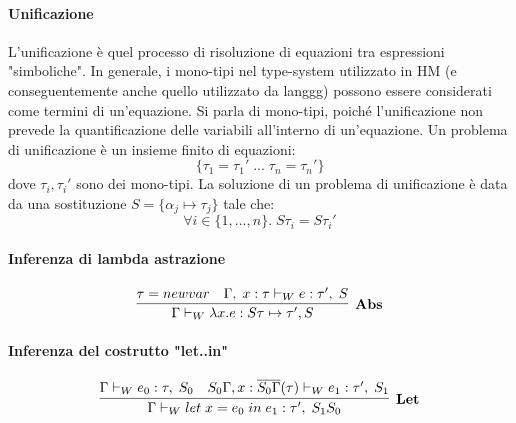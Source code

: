 \documentclass[10pt,a4paper]{article}
\begin{document}
\paragraph{Unificazione}
L'unificazione è quel processo di risoluzione di equazioni tra espressioni "simboliche". In generale, i mono-tipi nel
type-system utilizzato in HM (e conseguentemente anche quello utilizzato da langgg) possono essere considerati come
termini di un'equazione. Si parla di mono-tipi, poiché l'unificazione non prevede la quantificazione delle variabili
all'interno di un'equazione. Un problema di unificazione è un insieme finito di equazioni:
\[ \{ \tau_1 = \tau_1' \; ... \; \tau_n = \tau_n' \} \]
dove $ \tau_i, \tau_i' $ sono dei mono-tipi. La soluzione di un problema di unificazione è data da una sostituzione
$ S = \{ \alpha_j \mapsto \tau_j \} $ tale che:
\[ \forall i \in \{1, ..., n\}. \; S\tau_i = S\tau_i' \]

\paragraph{Inferenza di lambda astrazione}
\[ \infer[\textbf{Abs}]{\Gamma \vdash_W \lambda x. e : S\tau \mapsto \tau', S}{\tau = newvar & \Gamma, \; x : \tau \vdash_W e : \tau', \; S} \]

\paragraph{Inferenza del costrutto "let..in"}
\[ \infer[\textbf{Let}]{\Gamma \vdash_W let \; x = e_0 \; in \; e_1 : \tau', \; S_1S_0}{\Gamma \vdash_W e_0 : \tau, \; S_0 & S_0\Gamma, x : \overline{S_0\Gamma}(\tau) \vdash_W e_1 : \tau', \; S_1} \]
\end{document}
